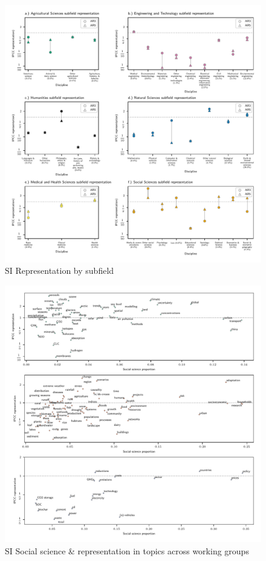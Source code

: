 \documentclass{article}
\begin{document}
	\begin{figure}
		\begin{center}
			\includegraphics[width=1\linewidth]{plots_pub/ipcc_rep_wcs_simplified.pdf}
			\caption{SI Representation by subfield}
			\label{subfield}
		\end{center}
	\end{figure}
	
	\begin{figure}
		\begin{center}
			\includegraphics[width=1\linewidth]{plots_pub/wgs_socsci.pdf}
			\caption{SI Social science \& representation in topics across working groups}
			\label{socsci-wgs}
		\end{center}
	\end{figure}
	
\end{document}
